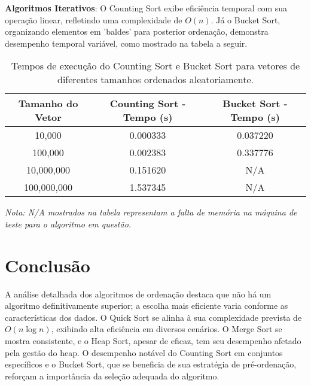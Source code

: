 \documentclass[conference]{IEEEtran}
\begin{document}
\vspace{0.4cm}
\textbf{Algoritmos Iterativos}: O Counting Sort exibe eficiência temporal com sua operação linear, refletindo uma complexidade de \( O(n) \). Já o Bucket Sort, organizando elementos em 'baldes' para posterior ordenação, demonstra desempenho temporal variável, como mostrado na tabela a seguir.


\vspace{0.5cm}
\begin{table}[ht]
\centering
\caption{Tempos de execução do Counting Sort e Bucket Sort para vetores de diferentes tamanhos ordenados aleatoriamente.}
\label{tab:sorting_algorithms_execution_times}
\begin{tabular}{@{}ccc@{}}
\toprule
Tamanho do Vetor & Counting Sort - Tempo (s) & Bucket Sort - Tempo (s) \\ \midrule
10,000           & 0.000333                      & 0.037220                     \\
100,000          & 0.002383                      & 0.337776                     \\
10,000,000       & 0.151620                      & N/A                            \\ %
 100,000,000      & 1.537345                      & N/A    
      \\%
\bottomrule
\end{tabular}
\end{table}
{\small \textit{Nota: N/A mostrados na tabela representam a falta de memória na máquina de teste para o algoritmo em questão.}}

\vspace{0.5cm}

\section{Conclusão}
A análise detalhada dos algoritmos de ordenação destaca que não há um algoritmo definitivamente superior; a escolha mais eficiente varia conforme as características dos dados. O Quick Sort se alinha à sua complexidade prevista de \( O(n \log n) \), exibindo alta eficiência em diversos cenários. O Merge Sort se mostra consistente, e o Heap Sort, apesar de eficaz, tem seu desempenho afetado pela gestão do heap. O desempenho notável do Counting Sort em conjuntos específicos e o Bucket Sort, que se beneficia de sua estratégia de pré-ordenação, reforçam a importância da seleção adequada do algoritmo.
\end{document}

